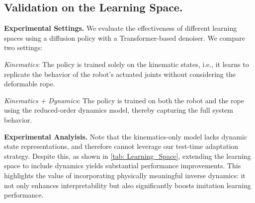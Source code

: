\documentclass{article}
\begin{document}
\subsection{Validation on the Learning Space.}
\textbf{Experimental Settings.} We evaluate the effectiveness of different learning spaces using a diffusion policy with a Transformer-based denoiser. We compare two settings:

\textit{Kinematics}: The policy is trained solely on the kinematic states, i.e., it learns to replicate the behavior of the robot’s actuated joints without considering the deformable rope.

\textit{Kinematics + Dynamics}: The policy is trained on both the robot and the rope using the reduced-order dynamics model, thereby capturing the full system behavior.

\textbf{Experimental Analyisis.} Note that the kinematics-only model lacks dynamic state representations, and therefore cannot leverage our test-time adaptation strategy. Despite this, as shown in \cref{tab: Learning_Space}, extending the learning space to include dynamics yields substantial performance improvements. This highlights the value of incorporating physically meaningful inverse dynamics: it not only enhances interpretability but also significantly boosts imitation learning performance.
\begin{table}[t]
\centering
\vspace{-0.4cm}
\caption{Quantitative comparison of learning spaces. The extending the learning space to include dynamics leads to significant improvements in task performance.}
\vspace{-0.8cm}
\label{tab: Learning_Space}
\end{table}
\end{document}
